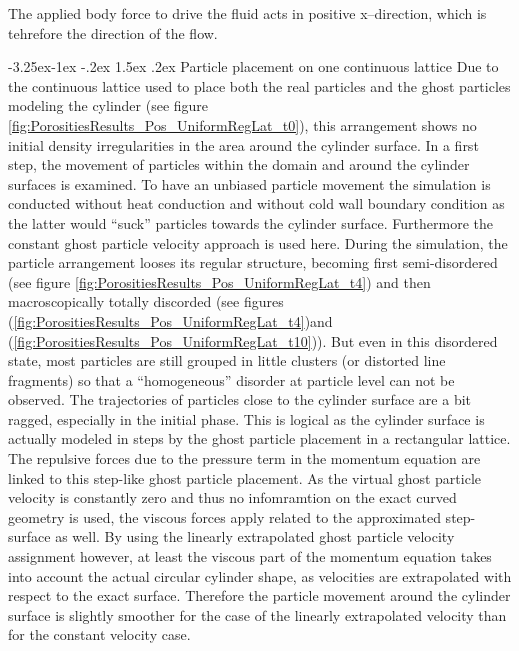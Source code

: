 \documentclass[11pt,a4paper,twoside]{report}
\makeatletter
\renewcommand\paragraph{\@startsection{paragraph}{4}{\z@}%
  {-3.25ex\@plus -1ex \@minus -.2ex}%
  {1.5ex \@plus .2ex}%
  {\normalfont\normalsize\bfseries}}
\makeatother
\begin{document}
The applied body force to drive the fluid acts in positive x--direction, which is tehrefore the direction of the flow. 

\paragraph{Particle placement on one continuous lattice}
Due to the continuous lattice used to place both the real particles and the ghost particles modeling the cylinder (see figure \ref{fig:PorositiesResults_Pos_UniformRegLat_t0}), this arrangement shows no initial density irregularities in the area around the cylinder surface. 
In a first step, the movement of particles within the domain and around the cylinder surfaces is examined. To have an unbiased particle movement the simulation is conducted without heat conduction and without cold wall boundary condition as the latter would ``suck'' particles towards the cylinder surface. Furthermore the constant ghost particle velocity approach is used here. 
During the simulation, the particle arrangement looses its regular structure, becoming first semi-disordered (see figure \ref{fig:PorositiesResults_Pos_UniformRegLat_t4}) and then macroscopically totally discorded (see figures (\ref{fig:PorositiesResults_Pos_UniformRegLat_t4})and  (\ref{fig:PorositiesResults_Pos_UniformRegLat_t10})). But even in this disordered state, most particles are still grouped in little clusters (or distorted line fragments) so that a ``homogeneous'' disorder at particle level can not be observed.
The trajectories of particles close to the cylinder surface are a bit ragged, especially in the initial phase. This is logical as the cylinder surface is actually modeled in steps by the ghost particle placement in a rectangular lattice. The repulsive forces due to the pressure term in the momentum equation are linked to this step-like ghost particle placement. As the virtual ghost particle velocity is constantly zero and thus no infomramtion on the exact curved geometry is used, the viscous forces apply related to the approximated step-surface as well.
By using the linearly extrapolated ghost particle velocity assignment however, at least the viscous part of the momentum equation takes into account the actual circular cylinder shape, as velocities are extrapolated with respect to the exact surface. Therefore the particle movement around the cylinder surface is slightly smoother for the case of the linearly extrapolated velocity than for the constant velocity case. 
\end{document}
